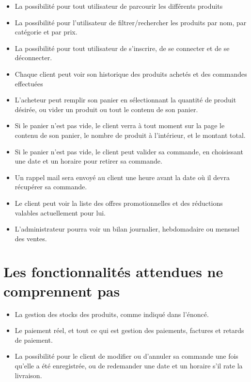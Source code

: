\documentclass[12pt]{report}
\begin{document}
\begin{spacing}{1.2}
\begin{itemize}
\item{La possibilité pour tout utilisateur de parcourir les différents produits}

\item{La possibilité pour l’utilisateur de filtrer/rechercher les produits par nom, par catégorie et par prix.}

\item{La possibilité pour tout utilisateur de s’inscrire, de se connecter et de se déconnecter.}

\item{Chaque client peut voir son historique des produits achetés et des commandes effectuées}

\item{L’acheteur peut remplir son panier en sélectionnant la quantité de produit désirée, ou vider un produit ou tout le contenu de son panier.}

\item{Si le panier n’est pas vide, le client verra à tout moment sur la page le contenu de son panier, le nombre de produit à l’intérieur, et le montant total.}

\item{Si le panier n’est pas vide, le client peut valider sa commande, en choisissant une date et un horaire pour retirer sa commande.}

\item{Un rappel mail sera envoyé au client une heure avant la date où il devra récupérer sa commande.}

\item{Le client peut voir la liste des offres promotionnelles et des réductions valables actuellement pour lui.}

\item{L’administrateur pourra voir un bilan journalier, hebdomadaire ou mensuel des ventes.}

\end{itemize}

\section{Les fonctionnalités attendues ne comprennent pas}
\begin{itemize}
\item{La gestion des stocks des produits, comme indiqué dans l’énoncé.}

\item{Le paiement réel, et tout ce qui est gestion des paiements, factures et retards de paiement.}

\item{La possibilité pour le client de modifier ou d’annuler sa commande une fois qu’elle a été enregistrée,
ou de redemander une date et un horaire s’il rate la livraison.}

\end{itemize}

\end{spacing}
\end{document}
